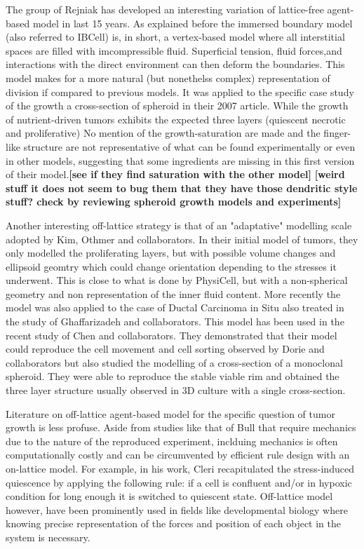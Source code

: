 \documentclass[11pt,a4paper]{article}
\begin{document}
The group of Rejniak has developed an interesting variation of lattice-free agent-based model in last 15 years.\cite{Rejniak2007}\cite{Rejniak2012} As explained before the immersed boundary model (also referred to IBCell) is, in short, a vertex-based model where all interstitial spaces are filled with imcompressible fluid. Superficial tension, fluid forces,and interactions with the direct environment can then deform the boundaries. This model makes for a more natural (but nonethelss complex) representation of division if compared to previous models. It was applied to the specific case study of the growth a cross-section of spheroid in their 2007 article.\cite{Rejniak2007} While the growth of nutrient-driven tumors exhibits the expected three layers (quiescent necrotic and proliferative) No mention of the growth-saturation are made and the finger-like structure are not representative of what can be found experimentally or even in other models, suggesting that some ingredients are missing in this first version of their model.\textbf{[see if they find saturation with the other model]} \textbf{[weird stuff it does not seem to bug them that they have those dendritic style stuff? check by reviewing spheroid growth models and experiments]} %

Another interesting off-lattice strategy is that of an "adaptative" modelling scale adopted by Kim, Othmer and collaborators. In their initial model of tumors, they only modelled the proliferating layers, but with possible volume changes and ellipsoid geomtry which could change orientation depending to the stresses it underwent.\cite{Kim2007}\cite{Stolarska2009} This is close to what is done by PhysiCell, but with a non-spherical geometry and non representation of the inner fluid content. More recently the model was also applied to the case of Ductal Carcinoma in Situ also treated in the study of Ghaffarizadeh and collaborators.\cite{Kim2013} This model has been used in the recent study of Chen and collaborators.\cite{Chen2018} They demonstrated that their model could reproduce the cell movement and cell sorting observed by Dorie and collaborators but also studied the modelling of a cross-section of a monoclonal spheroid. They were able to reproduce the stable viable rim and obtained the three layer structure usually observed in 3D culture with a single cross-section.


Literature on off-lattice agent-based model for the specific question of tumor growth is less profuse. Aside from studies like that of Bull that require mechanics due to the nature of the reproduced experiment, inclduing mechanics is often computationally costly and can be circumvented by efficient rule design with an on-lattice model. For example, in his work, Cleri recapitulated the stress-induced quiescence by applying the following rule: if a cell is confluent and/or in hypoxic condition for long enough it is switched to  quiescent state. Off-lattice model however, have been prominently used in fields like developmental biology where knowing precise representation of the forces and position of each object in the system is necessary.
\end{document}
